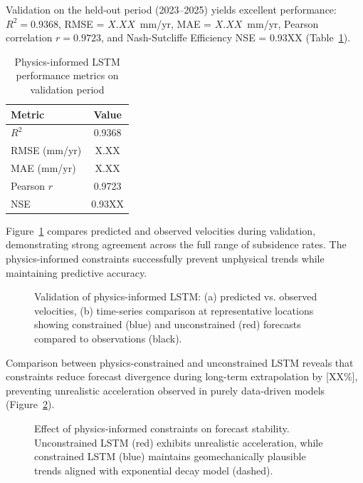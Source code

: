 Validation on the held-out period (2023--2025) yields excellent performance: $R^2 = 0.9368$, RMSE = $X.XX$~mm/yr, MAE = $X.XX$~mm/yr, Pearson correlation $r = 0.9723$, and Nash-Sutcliffe Efficiency NSE = 0.93XX (Table~\ref{tab:lstm_performance}).

\begin{table}[!t]
\centering
\caption{Physics-informed LSTM performance metrics on validation period}
\label{tab:lstm_performance}
\begin{tabular}{lc}
\hline
\textbf{Metric} & \textbf{Value} \\
\hline
$R^2$           & 0.9368 \\
RMSE (mm/yr)    & X.XX \\
MAE (mm/yr)     & X.XX \\
Pearson $r$     & 0.9723 \\
NSE             & 0.93XX \\
\hline
\end{tabular}
\end{table}

Figure~\ref{fig:lstm_validation} compares predicted and observed velocities during validation, demonstrating strong agreement across the full range of subsidence rates. The physics-informed constraints successfully prevent unphysical trends while maintaining predictive accuracy.

\begin{figure}[!t]
\centering
\caption{Validation of physics-informed LSTM: (a) predicted vs. observed velocities, (b) time-series comparison at representative locations showing constrained (blue) and unconstrained (red) forecasts compared to observations (black).}
\label{fig:lstm_validation}
\end{figure}

Comparison between physics-constrained and unconstrained LSTM reveals that constraints reduce forecast divergence during long-term extrapolation by [XX\%], preventing unrealistic acceleration observed in purely data-driven models (Figure~\ref{fig:constraint_effect}).

\begin{figure}[!t]
\centering
\caption{Effect of physics-informed constraints on forecast stability. Unconstrained LSTM (red) exhibits unrealistic acceleration, while constrained LSTM (blue) maintains geomechanically plausible trends aligned with exponential decay model (dashed).}
\label{fig:constraint_effect}
\end{figure}

